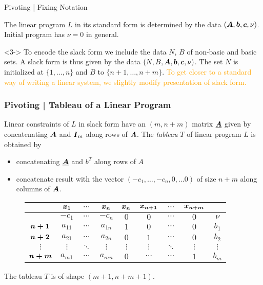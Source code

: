 \documentclass[aspectratio = 169]{beamer}
\begin{document}
\begin{frame}{Pivoting | Fixing Notation}
\begin{overlayarea}{\textwidth}{.3\textheight}
\begin{onlyenv}
          The linear program $L$ in its standard form is determined by
          the data $(\boldsymbol{A}, \boldsymbol{b}, \boldsymbol{c}, \nu)$. Initial program
          has $\nu = 0$ in general.
        \end{onlyenv}
        \begin{onlyenv}<3->
          To encode the slack form we include the data $N$, $B$ of
          non-basic and basic sets. A slack form is thus given by the
          data $(N, B, \boldsymbol{A}, \boldsymbol{b}, \boldsymbol{c}, \nu)$. The set $N$ is
          initialized at $\{1, \ldots, n\}$ and $B$ to
          $\{n+1, \ldots, n+m\}$. \pause[4] \textcolor{orange}{To get
            closer to a standard way of writing a linear system, we
            slightly modify presentation of slack form.}
        \end{onlyenv}
    \end{overlayarea}
\end{frame}

\begin{frame}
  \frametitle{Pivoting | Tableau of a Linear Program}
  Linear constraints of $L$ in slack form have an $(m, n+m)$ matrix
  $\underline{\boldsymbol{A}}$ given by concatenating $\boldsymbol{A}$ and $\boldsymbol{I}_m$
  along rows of $\boldsymbol{A}$. The \emph{tableau} $T$ of linear program $L$
  is obtained by
  \begin{itemize}
  \item<2-> concatenating $\underline{\boldsymbol{A}}$ and $b^T$
    along rows of $A$
  \item<3-> concatenate result with the vector
    $(-c_1, \ldots, -c_n, 0, \ldots 0)$ of size $n+m$ along columns of
    $\boldsymbol{A}$.
  \end{itemize}
  \pause[4]
  \begin{figure}
    \begin{tabular}{c|ccc|cccc|c|}
       & \alert{$\boldsymbol{x_1}$} & \alert{$\cdots$} & \alert{$\boldsymbol{x_n}$} & \alert{$\boldsymbol{x_n}$} & \alert{$\boldsymbol{x_{n+1}}$} & \alert{$\cdots$} & \alert{$\boldsymbol{x_{n+m}}$} &  \\
      \hline
       & $-c_1$ & $\cdots$ & $-c_n$ & $0$ & $0$ & $\cdots$ & $0$ & $\nu$ \\
      \hline
      \alert{$\boldsymbol{n+1}$} & $a_{11}$ & $\cdots$ & $a_{1n}$ & $1$ & $0$ & $\cdots$ & $0$ & $b_1$ \\
      \alert{$\boldsymbol{n+2}$}& $a_{21}$ & $\cdots$ & $a_{2n}$ & $0$ & $1$ & $\cdots$ & $0$ & $b_2$ \\
      \alert{$\vdots$}& $\vdots$ & $\ddots$ & $\vdots$ & $\vdots$ & $\vdots$ & $\ddots$ & $\vdots$ & $\vdots$ \\
      \alert{$\boldsymbol{n+m}$} & $a_{m1}$ & $\cdots$  & $a_{mn}$  & $0$ & $\cdots$ & $\cdots$ & $1$ & $b_m$
    \end{tabular}
  \end{figure}
  The tableau $T$ is of shape $(m+1, n + m + 1)$.
  \end{frame}
\end{document}
